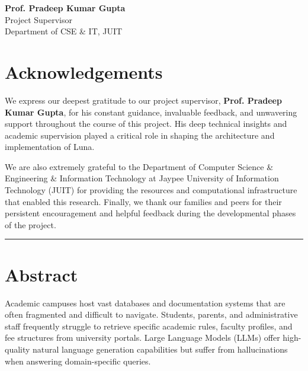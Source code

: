 \documentclass[12pt,a4paper]{article}
\begin{document}
\vspace{2cm}

\noindent\begin{minipage}[t]{0.5\textwidth}
    \textbf{Prof. Pradeep Kumar Gupta} \\
    Project Supervisor \\
    Department of CSE \& IT, JUIT
\end{minipage}

\newpage

\section*{Acknowledgements}

We express our deepest gratitude to our project supervisor, \textbf{Prof. Pradeep Kumar Gupta}, for his constant guidance, invaluable feedback, and unwavering support throughout the course of this project. His deep technical insights and academic supervision played a critical role in shaping the architecture and implementation of Luna.

We are also extremely grateful to the Department of Computer Science \& Engineering \& Information Technology at Jaypee University of Information Technology (JUIT) for providing the resources and computational infrastructure that enabled this research. Finally, we thank our families and peers for their persistent encouragement and helpful feedback during the developmental phases of the project.

\vspace{1.5cm}

\hrule
\vspace{0.5cm}
\section*{Abstract}

Academic campuses host vast databases and documentation systems that are often fragmented and difficult to navigate. Students, parents, and administrative staff frequently struggle to retrieve specific academic rules, faculty profiles, and fee structures from university portals. Large Language Models (LLMs) offer high-quality natural language generation capabilities but suffer from hallucinations when answering domain-specific queries. 
\end{document}

